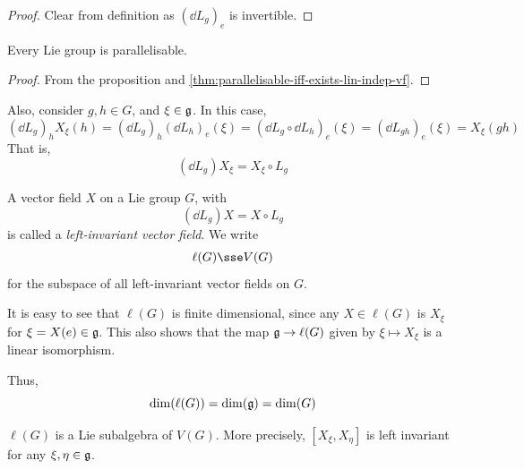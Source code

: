 \documentclass{article}
\begin{document}
\begin{proof}
    Clear from definition as \((\dd L_g)_e\) is invertible.
\end{proof}

\begin{theorem}
    Every Lie group is parallelisable.
\end{theorem}

\begin{proof}
    From the proposition and \cref{thm:parallelisable-iff-exists-lin-indep-vf}.
\end{proof}

Also, consider \(g, h \in G\), and \(\xi \in \mathfrak{g}\). In this case,
\[(\dd L_g)_hX_\xi(h) = (\dd L_g)_h(\dd L_h)_e(\xi) = (\dd L_g \circ \dd L_h)_e(\xi) = (\dd L_{gh})_e(\xi) = X_\xi(gh)\]
That is,
\[(\dd L_g)X_\xi = X_\xi \circ L_g\]

\begin{definition}
    A vector field \(X\) on a Lie group \(G\), with
    \begin{equation}
        \label{eq:left-inv-vf-def}
        (\dd L_g)X = X\circ L_g
    \end{equation}
    is called a \emph{left-invariant vector field}. We write
    \[\ell(G) \sse V(G)\]
    for the subspace of all left-invariant vector fields on \(G\). 
\end{definition}

It is easy to see that \(\ell(G)\) is finite dimensional, since any \(X \in \ell(G)\) is \(X_\xi\) for \(\xi = X(e) \in \mathfrak{g}\). This also shows that the map \(\mathfrak{g} \to \ell(G)\) given by \(\xi \mapsto X_\xi\) is a linear isomorphism.

Thus,
\[\dim(\ell(G)) = \dim(\mathfrak{g}) = \dim(G)\]

\begin{theorem}
    \(\ell(G)\) is a Lie subalgebra of \(V(G)\). More precisely, \([X_\xi, X_\eta]\) is left invariant for any \(\xi, \eta \in \mathfrak{g}\).
\end{theorem}
\end{document}
